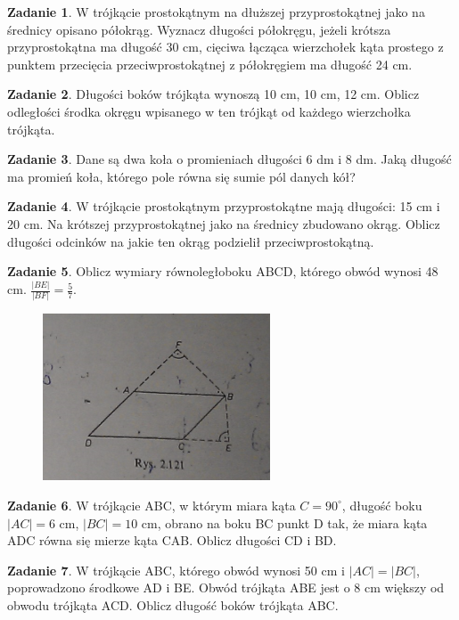 \documentclass[11pt]{article}
\theoremstyle{definition}
\newtheorem{zad}{Zadanie}
\numberwithin{zad}{section}
\begin{document}
\begin{zad}
W trójkącie prostokątnym na dłuższej przyprostokątnej jako na średnicy opisano półokrąg. Wyznacz długości półokręgu, jeżeli krótsza przyprostokątna ma długość 30 cm, cięciwa łącząca wierzchołek kąta prostego z punktem przecięcia przeciwprostokątnej z półokręgiem ma długość 24 cm.
\end{zad}

\begin{zad}
Długości boków trójkąta wynoszą 10 cm, 10 cm, 12 cm. Oblicz odległości środka okręgu wpisanego w ten trójkąt od każdego wierzchołka trójkąta.
\end{zad}

\begin{zad}
Dane są dwa koła o promieniach długości 6 dm i 8 dm. Jaką długość ma promień koła, którego pole równa się sumie pól danych kół?
\end{zad}

\begin{zad}
W trójkącie prostokątnym przyprostokątne mają długości: 15 cm i 20 cm. Na krótszej przyprostokątnej jako na średnicy zbudowano okrąg. Oblicz długości odcinków na jakie ten okrąg podzielił przeciwprostokątną.
\end{zad}

\begin{zad}
Oblicz wymiary równoległoboku ABCD, którego obwód wynosi 48 cm. $\frac{|BE|}{|BF|} = \frac57$.

\begin{figure}[h]
\centering
\includegraphics[width=0.4\linewidth]{rys2121.png}
\end{figure}
\end{zad}


\begin{zad}
W trójkącie ABC, w którym miara kąta $C=90^\circ$, długość boku $|AC|=6$ cm, $|BC| = 10$ cm, obrano na boku BC punkt D tak, że miara kąta ADC równa się mierze kąta CAB. Oblicz długości CD i BD.
\end{zad}

\begin{zad}
W trójkącie ABC, którego obwód wynosi 50 cm i $|AC| = |BC|$, poprowadzono środkowe AD i BE. Obwód trójkąta ABE jest o 8 cm większy od obwodu trójkąta ACD. Oblicz długość boków trójkąta ABC.
\end{zad}
\end{document}
